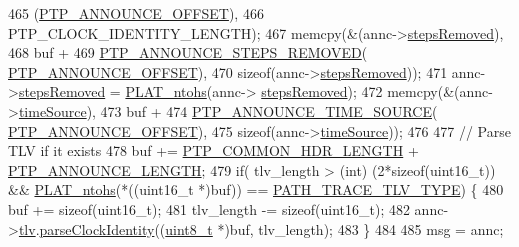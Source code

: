\begin{DoxyCode}
{{{{{{{{465                    (\hyperlink{avbts__message_8hpp_aaa3da4fa4e9e4cfe49477cd7f6b95bca}{PTP\_ANNOUNCE\_OFFSET}),
466                    PTP\_CLOCK\_IDENTITY\_LENGTH);
467             memcpy(&(annc->\hyperlink{class_p_t_p_message_announce_ab24df4cccbede4b07586878ef0d47395}{stepsRemoved}),
468                    buf +
469                    \hyperlink{avbts__message_8hpp_ad9e2d7ce4d1384fad376314924fa4cea}{PTP\_ANNOUNCE\_STEPS\_REMOVED}(
      \hyperlink{avbts__message_8hpp_aaa3da4fa4e9e4cfe49477cd7f6b95bca}{PTP\_ANNOUNCE\_OFFSET}),
470                    \textcolor{keyword}{sizeof}(annc->\hyperlink{class_p_t_p_message_announce_ab24df4cccbede4b07586878ef0d47395}{stepsRemoved}));
471             annc->\hyperlink{class_p_t_p_message_announce_ab24df4cccbede4b07586878ef0d47395}{stepsRemoved} = \hyperlink{linux_2src_2platform_8cpp_a6b8f3e7b87b66fa774a07ddc67f883a7}{PLAT\_ntohs}(annc->
      \hyperlink{class_p_t_p_message_announce_ab24df4cccbede4b07586878ef0d47395}{stepsRemoved});
472             memcpy(&(annc->\hyperlink{class_p_t_p_message_announce_a56fd97f48cb931b2450032650f82ef17}{timeSource}),
473                    buf +
474                    \hyperlink{avbts__message_8hpp_ac69e2a9341554bbbf10612cd50b5f181}{PTP\_ANNOUNCE\_TIME\_SOURCE}(
      \hyperlink{avbts__message_8hpp_aaa3da4fa4e9e4cfe49477cd7f6b95bca}{PTP\_ANNOUNCE\_OFFSET}),
475                    \textcolor{keyword}{sizeof}(annc->\hyperlink{class_p_t_p_message_announce_a56fd97f48cb931b2450032650f82ef17}{timeSource}));
476 
477             \textcolor{comment}{// Parse TLV if it exists}
478             buf += \hyperlink{avbts__message_8hpp_a8ec4d965b7b1e83844f1c17f12e9b8e4}{PTP\_COMMON\_HDR\_LENGTH} + 
      \hyperlink{avbts__message_8hpp_ad800b5cd5359d021054af8e902100ba7}{PTP\_ANNOUNCE\_LENGTH};
479             \textcolor{keywordflow}{if}( tlv\_length > (\textcolor{keywordtype}{int}) (2*\textcolor{keyword}{sizeof}(uint16\_t)) && \hyperlink{linux_2src_2platform_8cpp_a6b8f3e7b87b66fa774a07ddc67f883a7}{PLAT\_ntohs}(*((uint16\_t *)buf)) == 
      \hyperlink{avbts__message_8hpp_a10ec0e6a0943853c9deaf56616dbebf7}{PATH\_TRACE\_TLV\_TYPE})  \{
480                 buf += \textcolor{keyword}{sizeof}(uint16\_t);
481                 tlv\_length -= \textcolor{keyword}{sizeof}(uint16\_t);
482                 annc->\hyperlink{class_p_t_p_message_announce_ac7b185260086ad357ff7a9c29f468936}{tlv}.\hyperlink{class_path_trace_t_l_v_a66b71b1178893f98ba403e961e8fb6cf}{parseClockIdentity}((\hyperlink{stdint_8h_aba7bc1797add20fe3efdf37ced1182c5}{uint8\_t} *)buf, tlv\_length);
483             \}
484 
485             msg = annc;
}}}}}}}}
\end{DoxyCode}
